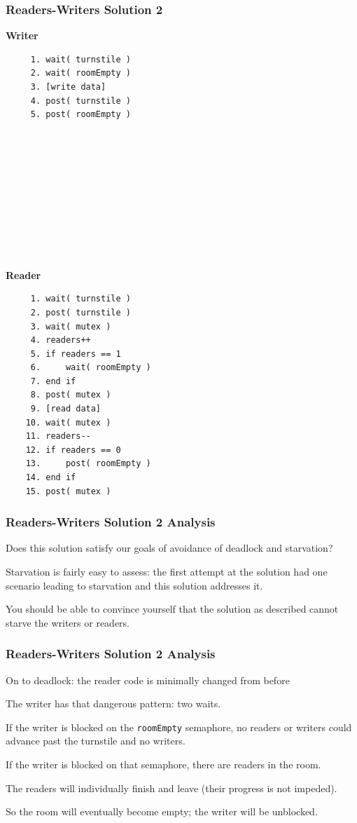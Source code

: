\begin{frame}[fragile]
	\frametitle{Readers-Writers Solution 2}
	\begin{multicols}{2}
		\textbf{Writer}
		\begin{verbatim}
	 1. wait( turnstile )
	 2. wait( roomEmpty )
	 3. [write data]
	 4. post( turnstile )
	 5. post( roomEmpty )
	 
	 
	 
	 
	 
	 
	 
	 
	 
	 
  \end{verbatim}
		\columnbreak
		\textbf{Reader}
		\begin{verbatim}
	 1. wait( turnstile )
	 2. post( turnstile )
	 3. wait( mutex )
	 4. readers++
	 5. if readers == 1
	 6.     wait( roomEmpty )
	 7. end if
	 8. post( mutex )
	 9. [read data]
	10. wait( mutex )
	11. readers--
	12. if readers == 0
	13.     post( roomEmpty )
	14. end if
	15. post( mutex )
  \end{verbatim}
	\end{multicols}

\end{frame}


\begin{frame}
	\frametitle{Readers-Writers Solution 2 Analysis}

	Does this solution satisfy our goals of avoidance of deadlock and starvation?

	Starvation is fairly easy to assess: the first attempt at the solution had one scenario leading to starvation and this solution addresses it.

	You should be able to convince yourself that the solution as described cannot starve the writers or readers.


\end{frame}


\begin{frame}
	\frametitle{Readers-Writers Solution 2 Analysis}

	On to deadlock: the reader code is minimally changed from before

	The writer has that dangerous pattern: two waits.

	If the writer is blocked on the \texttt{roomEmpty} semaphore, no readers or writers could advance past the turnstile and no writers.

	If the writer is blocked on that semaphore, there are readers in the room.

	The readers will individually finish and leave (their progress is not impeded).

	So the room will eventually become empty; the writer will be unblocked.


\end{frame}


